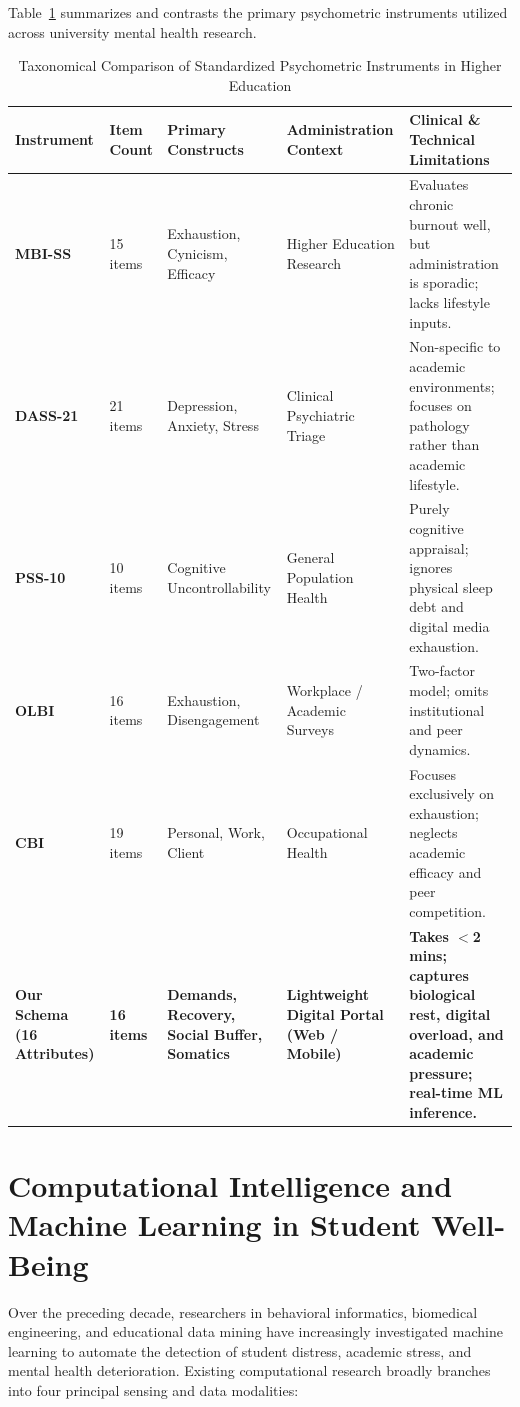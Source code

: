 \documentclass[12pt,a4paper,oneside]{report}
\begin{document}
Table~\ref{tab:psychometric_comparison} summarizes and contrasts the primary psychometric instruments utilized across university mental health research.

\begin{table}[H]
\centering
\caption{Taxonomical Comparison of Standardized Psychometric Instruments in Higher Education}
\label{tab:psychometric_comparison}
\scriptsize
\begin{tabularx}{\textwidth}{p{2.2cm}p{1.4cm}p{1.8cm}p{2.5cm}X}
\toprule
\textbf{Instrument} & \textbf{Item Count} & \textbf{Primary Constructs} & \textbf{Administration Context} & \textbf{Clinical \& Technical Limitations} \\
\midrule
\textbf{MBI-SS} \cite{schaufeli2002} & 15 items & Exhaustion, Cynicism, Efficacy & Higher Education Research & Evaluates chronic burnout well, but administration is sporadic; lacks lifestyle inputs. \\
\textbf{DASS-21} \cite{lovibond1995} & 21 items & Depression, Anxiety, Stress & Clinical Psychiatric Triage & Non-specific to academic environments; focuses on pathology rather than academic lifestyle. \\
\textbf{PSS-10} \cite{cohen1983} & 10 items & Cognitive Uncontrollability & General Population Health & Purely cognitive appraisal; ignores physical sleep debt and digital media exhaustion. \\
\textbf{OLBI} \cite{demerouti2001} & 16 items & Exhaustion, Disengagement & Workplace / Academic Surveys & Two-factor model; omits institutional and peer dynamics. \\
\textbf{CBI} & 19 items & Personal, Work, Client & Occupational Health & Focuses exclusively on exhaustion; neglects academic efficacy and peer competition. \\
\midrule
\textbf{Our Schema (16 Attributes)} & \textbf{16 items} & \textbf{Demands, Recovery, Social Buffer, Somatics} & \textbf{Lightweight Digital Portal (Web / Mobile)} & \textbf{Takes $<$2 mins; captures biological rest, digital overload, and academic pressure; real-time ML inference.} \\
\bottomrule
\end{tabularx}
\end{table}

\section{Computational Intelligence and Machine Learning in Student Well-Being}
\label{sec:ml_in_mental_health}
Over the preceding decade, researchers in behavioral informatics, biomedical engineering, and educational data mining have increasingly investigated machine learning to automate the detection of student distress, academic stress, and mental health deterioration. Existing computational research broadly branches into four principal sensing and data modalities:
\end{document}
